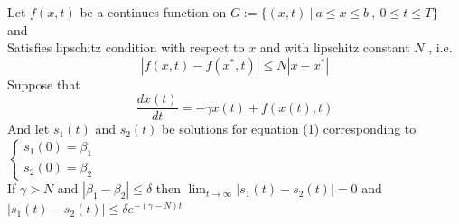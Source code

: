\newpage
\setcounter{equation}{0}
\begin{theorem}[]
    Let $f(x,t)$ be a continues function on $G:=\{(x,t) \ | \ a\leq x\leq b \ , \ 0\leq t \leq T\}$ and
    \\
    Satisfies lipschitz condition with respect to $x$ and with lipschitz constant $N$ , i.e.
    \[
        \left\lvert f(x,t) - f(x^*,t)\right\rvert \leq N \left\lvert x - x^*\right\rvert
    \]
    Suppose that
    \begin{equation}
        \frac{dx(t)}{dt} = -\gamma x(t) + f(x(t),t)
    \end{equation}
    And let $s_1(t)$ and $s_2(t)$ be solutions for equation (1) corresponding to
    $
        \begin{cases}
            s_1(0) = \beta_1
            \\
            s_2(0) = \beta_2
        \end{cases}
    $
    \\
    If $\gamma >N$ and $\left\lvert \beta_1 - \beta_2 \right\rvert \leq \delta $ then $\displaystyle \lim_{t \to \infty}|s_1(t) - s_2(t)| = 0 $
    and $|s_1(t) - s_2(t)| \leq \delta e^{-(\gamma-N)t}$
\end{theorem}
